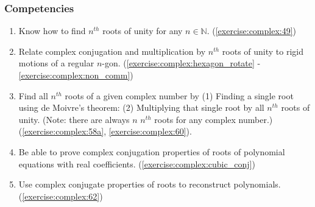\subsubsection*{Competencies}
\begin{enumerate}
\item
Know how to find $n^{th}$ roots of unity for any $n \in \mathbb{N}$. (\ref{exercise:complex:49})
\item
Relate complex conjugation and multiplication by $n^{th}$ roots of unity to rigid motions of a regular $n$-gon. (\ref{exercise:complex:hexagon_rotate} - \ref{exercise:complex:non_comm})
\item
Find all $n^{th}$ roots of a given complex number by (1) Finding a single root using de Moivre’s theorem: (2) Multiplying that single root by all $n^{th}$ roots of unity. (Note: there are always $n$ $n^{th}$ roots for any complex number.) (\ref{exercise:complex:58a}, \ref{exercise:complex:60}).
\item
Be able to prove complex conjugation properties of roots of polynomial equations with real coefficients. (\ref{exercise:complex:cubic_conj})
\item
Use complex conjugate properties of roots to reconstruct polynomials. (\ref{exercise:complex:62})
\end{enumerate}







